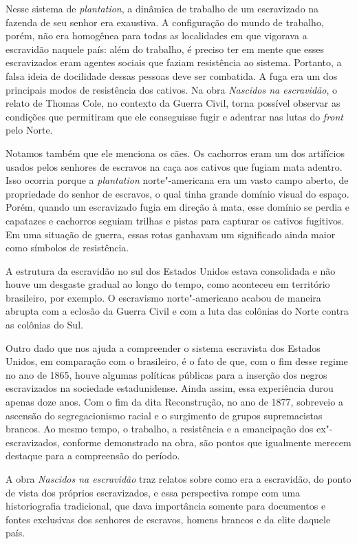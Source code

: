 \documentclass[11pt]{extarticle}
\begin{document}
\begin{enumerate}
\begin{enumerate}
\begin{enumerate}
Nesse sistema de \emph{plantation}, a dinâmica de trabalho de um
escravizado na fazenda de seu senhor era exaustiva. A configuração do
mundo de trabalho, porém, não era homogênea para todas as localidades em
que vigorava a escravidão naquele país: além do trabalho, é preciso ter
em mente que esses escravizados eram agentes sociais que faziam
resistência ao sistema. Portanto, a falsa ideia de docilidade dessas
pessoas deve ser combatida. A fuga era um dos principais modos de
resistência dos cativos. Na obra \emph{Nascidos na escravidão}, o relato
de Thomas Cole, no contexto da Guerra Civil, torna possível observar as
condições que permitiram que ele conseguisse fugir e adentrar nas lutas
do \emph{front} pelo Norte.

Notamos também que ele menciona os cães. Os cachorros eram um dos
artifícios usados pelos senhores de escravos na caça aos cativos que
fugiam mata adentro. Isso ocorria porque a \emph{plantation}
norte"-americana era um vasto campo aberto, de propriedade do senhor de
escravos, o qual tinha grande domínio visual do espaço. Porém, quando um
escravizado fugia em direção à mata, esse domínio se perdia e capatazes
e cachorros seguiam trilhas e pistas para capturar os cativos fugitivos.
Em uma situação de guerra, essas rotas ganhavam um significado ainda
maior como símbolos de resistência.

A estrutura da escravidão no sul dos Estados Unidos estava consolidada e
não houve um desgaste gradual ao longo do tempo, como aconteceu em
território brasileiro, por exemplo. O escravismo norte"-americano acabou
de maneira abrupta com a eclosão da Guerra Civil e com a luta das
colônias do Norte contra as colônias do Sul.

Outro dado que nos ajuda a compreender o sistema escravista dos Estados
Unidos, em comparação com o brasileiro, é o fato de que, com o fim desse
regime no ano de 1865, houve algumas políticas públicas para a inserção
dos negros escravizados na sociedade estadunidense. Ainda assim, essa
experiência durou apenas doze anos. Com o fim da dita Reconstrução, no
ano de 1877, sobreveio a ascensão do segregacionismo racial e o
surgimento de grupos supremacistas brancos. Ao mesmo tempo, o trabalho,
a resistência e a emancipação dos ex"-escravizados, conforme demonstrado
na obra, são pontos que igualmente merecem destaque para a compreensão
do período.

A obra \emph{Nascidos na escravidão} traz relatos sobre como era a
escravidão, do ponto de vista dos próprios escravizados, e essa
perspectiva rompe com uma historiografia tradicional, que dava
importância somente para documentos e fontes exclusivas dos senhores de
escravos, homens brancos e da elite daquele país.


\end{enumerate}
\end{enumerate}
\end{enumerate}
\end{document}
